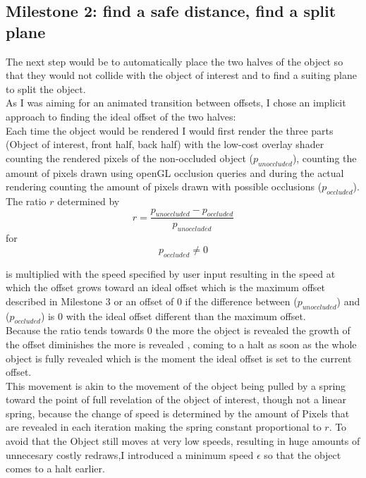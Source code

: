 \subsection{Milestone 2: find a safe distance, find a split plane} 
The next step would be to automatically place the two halves of the object so that they would not collide with the object of interest and to find a suiting plane to split the object.\\
As I was aiming for an animated transition between offsets, I chose an implicit approach to finding the ideal offset of the two halves:\\
Each time the object would be rendered I would first render the three parts (Object of interest, front half, back half) with the low-cost overlay shader counting the rendered pixels of the non-occluded object ($p_{unoccluded}$), counting the amount of pixels drawn using openGL occlusion queries and during the actual rendering counting the amount of pixels drawn with possible occlusions ($p_{occluded}$). The ratio $r$ determined by
\begin{equation}\label{eq:Occlusion ratio}
	r =\frac{p_{unoccluded} - p_{occluded}}{ p_{unoccluded}}
\end{equation}
for
\begin{equation}
	p_{occluded} \neq 0
\end{equation}

is multiplied with the speed specified by user input resulting in the speed at which the offset grows toward an ideal offset which is the maximum offset described in Milestone 3 or an offset of 0 if the difference between  ($p_{unoccluded}$) and  ($p_{occluded}$) is 0 with the ideal offset different than the maximum offset.\\
Because the ratio tends towards 0 the more the object is revealed the growth of the offset diminishes the more is revealed , coming to a halt as soon as the whole object is fully revealed which is the moment the ideal offset is set to the current offset.\\
This movement is akin to the movement of the object being pulled by a spring toward the point of full revelation of the object of interest, though not a linear spring, because the change of speed is determined by the amount of Pixels that are revealed in each iteration making the spring constant proportional to $r$.
To avoid that the Object still moves at very low speeds, resulting in huge amounts of unnecesary costly redraws,I introduced a  minimum speed $\epsilon$ so that the object comes to a halt earlier.\\
